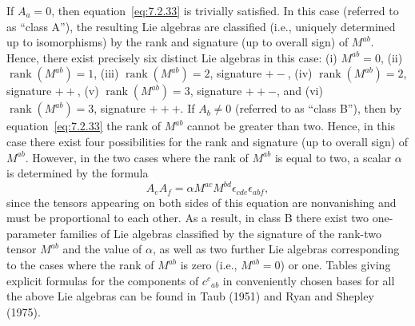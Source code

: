 If \(A_a=0\), then equation~\eqref{eq:7.2.33} is trivially satisfied. In this case
(referred to as “class A”), the resulting Lie algebras are classified (i.e., uniquely
determined up to isomorphisms) by the rank and signature (up to overall sign) of
\(M^{ab}\). Hence, there exist precisely six distinct Lie algebras in this case:
(i) \(M^{ab}=0\), (ii) \(\operatorname{rank}(M^{ab})=1\),
(iii) \(\operatorname{rank}(M^{ab})=2\), signature \(+-\),
(iv) \(\operatorname{rank}(M^{ab})=2\), signature \(++\),
(v) \(\operatorname{rank}(M^{ab})=3\), signature \(++-\), and
(vi) \(\operatorname{rank}(M^{ab})=3\), signature \(+++\).
If \(A_b\ne0\) (referred to as “class B”), then by
equation~\eqref{eq:7.2.33} the rank of \(M^{ab}\) cannot be greater than two.
Hence, in this case there exist four possibilities for the rank and signature (up to
overall sign) of \(M^{ab}\). However, in the two cases where the rank of \(M^{ab}\)
is equal to two, a scalar \(\alpha\) is determined by the formula
\begin{equation}
  A_eA_f
    =\alpha M^{ac}M^{bd}\epsilon_{cde}\epsilon_{abf} ,
  \tag{7.2.34}\label{eq:7.2.34}
\end{equation}
since the tensors appearing on both sides of this equation are nonvanishing and must
be proportional to each other. As a result, in class B there exist two one-parameter
families of Lie algebras classified by the signature of the rank-two tensor \(M^{ab}\)
and the value of \(\alpha\), as well as two further Lie algebras corresponding to the
cases where the rank of \(M^{ab}\) is zero (i.e., \(M^{ab}=0\)) or one. Tables
giving explicit formulas for the components of \(c^c{}_{ab}\) in conveniently
chosen bases for all the above Lie algebras can be found in Taub (1951) and Ryan
and Shepley (1975).

